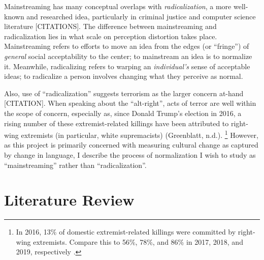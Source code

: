 \documentclass[acmlarge, screen, authorversion]{acmart}
\begin{document}
Mainstreaming has many conceptual overlaps with \textit{radicalization}, a more well-known and researched idea,
particularly in criminal justice and computer science literature [CITATIONS]. The
difference between mainstreaming and radicalization lies in what scale on
perception distortion takes place. Mainstreaming refers to efforts to move an idea from the edges
(or “fringe”) of \textit{general} social acceptability to the center; to mainstream an idea is to
normalize it. Meanwhile, radicalizing refers to warping an \textit{individual's} sense of acceptable
ideas; to radicalize a person involves changing what they perceive as normal.

Also, use of “radicalization” suggests terrorism as the larger
concern at-hand [CITATION]. When speaking about the “alt-right”, acts of
terror are well within the scope of concern, especially as, since Donald
Trump’s election in 2016, a rising number of these extremist-related
killings have been attributed to right-wing extremists (in particular,
white supremacists) (Greenblatt, n.d.). \footnote{In 2016, 13\% of domestic extremist-related
	killings were committed by right-wing extremists. Compare this to 56\%,
	78\%, and 86\% in 2017, 2018, and 2019, respectively \cite{greenblattRightWingExtremistViolence}.
} However, as this project is primarily concerned with
measuring cultural change as captured by change in language, I describe
the process of normalization I wish to study as “mainstreaming” rather
than “radicalization”. 

\section{Literature Review}
\end{document}
